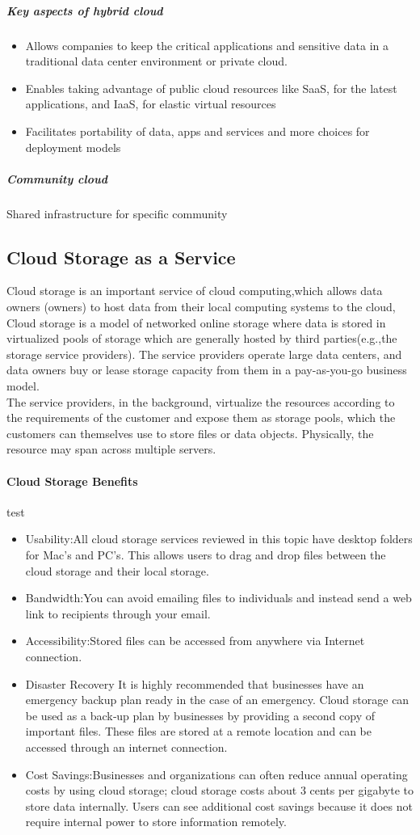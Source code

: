 \documentclass[11pt,a4paper]{report}
\begin{document}
\subparagraph*{Key aspects of hybrid cloud}
\begin{itemize}
\item Allows companies to keep the critical 	applications and sensitive data in a traditional 	data center environment or private cloud.
\item Enables taking advantage of public cloud 	resources like SaaS, for the latest applications, 	and IaaS, for elastic virtual resources
\item Facilitates portability of data, apps and services 	and more choices for deployment models
\end{itemize}
\subparagraph{Community cloud}
 Shared infrastructure for specific community       
\subsection{Cloud Storage as a Service}
Cloud storage is an important service of cloud computing,which allows data owners (owners) to host data from their local computing systems to the cloud, Cloud storage is a model of networked online storage where data is stored in virtualized pools of storage which are generally hosted by third parties(e.g.,the storage service providers). The service providers operate large data centers, and data owners buy or lease storage capacity from them in a pay-as-you-go business model.
\\The service providers, in the background, virtualize the resources according to the requirements of the customer and expose them as storage pools, which the customers can themselves use to store ﬁles or data objects. Physically, the resource may span across multiple servers.
 \paragraph{Cloud Storage Benefits}
 test
 \begin{itemize}
\item Usability:All cloud storage services reviewed in this topic have desktop folders for Mac’s and PC’s. This allows users to drag and drop files between the cloud storage and their local storage.
\item Bandwidth:You can avoid emailing files to individuals and instead send a web link to recipients through your email.
\item Accessibility:Stored files can be accessed from anywhere via Internet connection.
\item Disaster Recovery It is highly recommended that businesses have an emergency backup plan ready in the case of an emergency. Cloud storage can be used as a back‐up plan by businesses by providing a second copy of important files. These files are stored at a remote location and can be accessed through an internet connection.
\item Cost Savings:Businesses and organizations can often reduce annual operating costs by using cloud storage; cloud storage costs about 3 cents per gigabyte to store data internally. Users can see additional cost savings because it does not require internal power to store information remotely.
\end{itemize}
\end{document}
